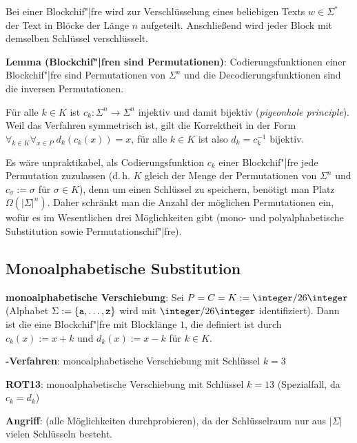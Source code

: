 Bei einer Blockchif"|fre wird zur Verschlüsselung eines beliebigen Texts $w \in \Sigma^\ast$ der
Text in Blöcke der Länge $n$ aufgeteilt.
Anschließend wird jeder Block mit demselben Schlüssel verschlüsselt.

\linie

\textbf{Lemma (Blockchif"|fren sind Permutationen)}:
Codierungsfunktionen einer Blockchif"|fre sind Permutationen von $\Sigma^n$
und die Decodierungsfunktionen sind die inversen Permutationen.

\begin{Beweis}
    Für alle $k \in K$ ist $c_k\colon \Sigma^n \rightarrow \Sigma^n$
    injektiv und damit bijektiv (\emph{pigeonhole principle}).
    Weil das Verfahren symmetrisch ist, gilt die Korrektheit in der Form
    $\forall_{k \in K} \forall_{x \in P}\; d_k(c_k(x)) = x$, für
    alle $k \in K$ ist also $d_k = c_k^{-1}$ bijektiv.
\end{Beweis}

Es wäre unpraktikabel, als Codierungsfunktion $c_k$ einer Blockchif"|fre jede Permutation
zuzulassen (d.\,h. $K$ gleich der Menge der Permutationen von $\Sigma^n$ und
$c_\sigma := \sigma$ für $\sigma \in K$),
denn um einen Schlüssel zu speichern, benötigt man Platz $\Omega(|\Sigma|^n)$.
Daher schränkt man die Anzahl der möglichen Permutationen ein,
wofür es im Wesentlichen drei Möglichkeiten gibt
(mono- und polyalphabetische Substitution sowie Permutationschif"|fre).

\subsection{%
    Monoalphabetische Substitution%
}

\textbf{monoalphabetische Verschiebung}:
Sei $P = C = K := \integer/26\integer$ (Alphabet $\Sigma := \{\texttt{a}, \dotsc, \texttt{z}\}$
wird mit $\integer/26\integer$ identifiziert).
Dann ist die  eine Blockchif"|fre mit Blocklänge $1$,
die definiert ist durch $c_k(x) := x + k$ und $d_k(x) := x - k$ für $k \in K$.

\textbf{-Verfahren}:
monoalphabetische Verschiebung mit Schlüssel $k = 3$

\textbf{ROT13}:
monoalphabetische Verschiebung mit Schlüssel $k = 13$ (Spezialfall, da $c_k = d_k$)

\textbf{Angriff}:
 (alle Möglichkeiten durchprobieren),
da der Schlüsselraum nur aus $|\Sigma|$ vielen Schlüsseln besteht.

